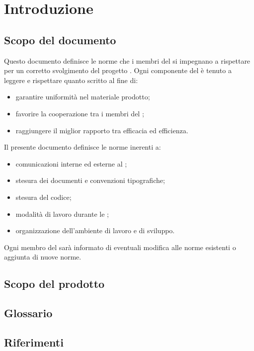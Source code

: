 \section{Introduzione}
    \subsection{Scopo del documento}
    Questo documento definisce le norme che i membri del  \zephyrus{} si impegnano a rispettare per un corretto svolgimento del progetto \progetto{}. Ogni componente del  è tenuto a leggere e rispettare quanto scritto al fine di:
    \begin{itemize}
        \item garantire uniformità nel materiale prodotto;
        \item favorire la cooperazione tra i membri del ;
        \item raggiungere il miglior rapporto tra efficacia ed efficienza.
    \end{itemize}
    Il presente documento definisce le norme inerenti a:
    \begin{itemize}
        \item comunicazioni interne ed esterne al ;
        \item stesura dei documenti e convenzioni tipografiche;
        \item stesura del codice;
        \item modalità di lavoro durante le ;
        \item organizzazione dell'ambiente di lavoro e di sviluppo.
    \end{itemize}
    Ogni membro del  sarà informato di eventuali modifica alle norme esistenti o aggiunta di nuove norme.

    \subsection{Scopo del prodotto}
        \introScopo

    \subsection{Glossario}
        \introGlossario

    \subsection{Riferimenti}
